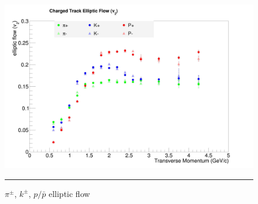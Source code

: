 \begin{figure}[htbp!]
  \centering
    \includegraphics[width=1\textwidth]{v2all.jpg}
    \rule{35em}{0.5pt}
  \caption[$\pi^{\pm}$, $k^{\pm}$, $p/\bar{p}$ elliptic flow,$\sqrt{s_{NN}}=$200 GeV d+Au collisions]{$\pi^{\pm}$, $k^{\pm}$, $p/\bar{p}$ elliptic flow}
  \label{fig:v2all}
\end{figure}

\pagebreak
\pagebreak
